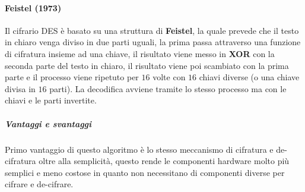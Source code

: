             \paragraph{Feistel (1973)}
                Il cifrario DES è basato su una struttura di \textbf{Feistel}, la quale prevede che il testo in chiaro venga diviso in due parti uguali, la prima passa attraverso una funzione di cifratura insieme ad una chiave, il risultato viene messo in \textbf{XOR} con la seconda parte del testo in chiaro, il risultato viene poi scambiato con la prima parte e il processo viene ripetuto per $16$ volte con $16$ chiavi diverse (o una chiave divisa in $16$ parti). La decodifica avviene tramite lo stesso processo ma con le chiavi e le parti invertite.
                \subparagraph{Vantaggi e svantaggi} Primo vantaggio di questo algoritmo è lo stesso meccanismo di cifratura e de-cifratura oltre alla semplicità, questo rende le componenti hardware molto più semplici e meno costose in quanto non necessitano di componenti diverse per cifrare e de-cifrare. 